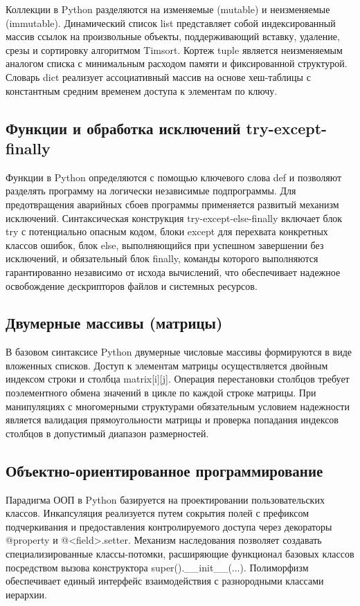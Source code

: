 \documentclass[14pt,a4paper]{extarticle}
\begin{document}
Коллекции в Python разделяются на изменяемые (mutable) и неизменяемые (immutable). Динамический список list представляет собой индексированный массив ссылок на произвольные объекты, поддерживающий вставку, удаление, срезы и сортировку алгоритмом Timsort. Кортеж tuple является неизменяемым аналогом списка с минимальным расходом памяти и фиксированной структурой. Словарь dict реализует ассоциативный массив на основе хеш-таблицы с константным средним временем доступа к элементам по ключу.

\subsection{Функции и обработка исключений try-except-finally}

Функции в Python определяются с помощью ключевого слова def и позволяют разделять программу на логически независимые подпрограммы. Для предотвращения аварийных сбоев программы применяется развитый механизм исключений. Синтаксическая конструкция try-except-else-finally включает блок try с потенциально опасным кодом, блоки except для перехвата конкретных классов ошибок, блок else, выполняющийся при успешном завершении без исключений, и обязательный блок finally, команды которого выполняются гарантированно независимо от исхода вычислений, что обеспечивает надежное освобождение дескрипторов файлов и системных ресурсов.

\subsection{Двумерные массивы (матрицы)}

В базовом синтаксисе Python двумерные числовые массивы формируются в виде вложенных списков. Доступ к элементам матрицы осуществляется двойным индексом строки и столбца matrix[i][j]. Операция перестановки столбцов требует поэлементного обмена значений в цикле по каждой строке матрицы. При манипуляциях с многомерными структурами обязательным условием надежности является валидация прямоугольности матрицы и проверка попадания индексов столбцов в допустимый диапазон размерностей.

\subsection{Объектно-ориентированное программирование}

Парадигма ООП в Python базируется на проектировании пользовательских классов. Инкапсуляция реализуется путем сокрытия полей с префиксом подчеркивания и предоставления контролируемого доступа через декораторы @property и @<field>.setter. Механизм наследования позволяет создавать специализированные классы-потомки, расширяющие функционал базовых классов посредством вызова конструктора super().\_\_init\_\_(...). Полиморфизм обеспечивает единый интерфейс взаимодействия с разнородными классами иерархии.
\end{document}
